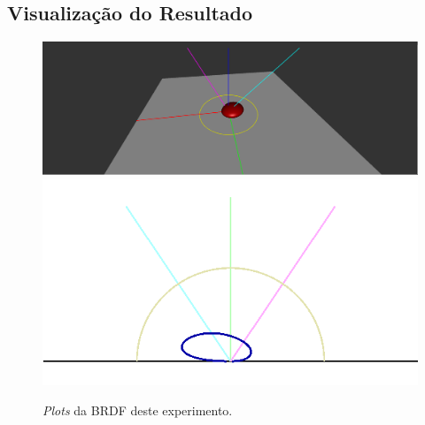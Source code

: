 \subsection{Visualização do Resultado}
\begin{figure}[H]
    \caption{\small{\textit{Plots} da BRDF deste experimento.}}\label{fig-duer-plots}
    \vspace{42px}
  \includegraphics[width=\linewidth]{./Imagens/brdfs/duer-3D-plot}
\endminipage\hfill
{}
  \includegraphics[width=\linewidth]{./Imagens/brdfs/duer-polar-plot.png}
\endminipage\hfill
\end{figure}

